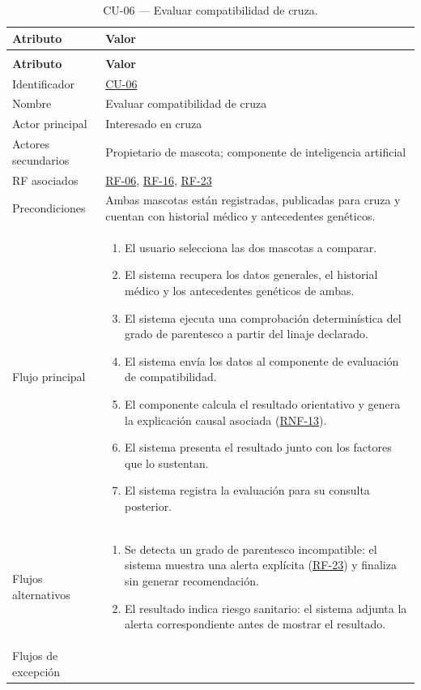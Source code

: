 \documentclass[journal,onecolumn]{IEEEtran}
\makeatletter
\newenvironment{atributos}[2]{%
	\small
	\begin{longtable}{@{}>{\raggedright\arraybackslash}p{4.2cm} >{\raggedright\arraybackslash}p{11.2cm}@{}}
		\caption{#2}\label{tab:#1}\\
		\toprule
		\textbf{Atributo} & \textbf{Valor} \\
		\midrule
		\endfirsthead
		\multicolumn{2}{@{}l}{\small\itshape (continuación)}\\
		\toprule
		\textbf{Atributo} & \textbf{Valor} \\
		\midrule
		\endhead
		\bottomrule
		\endlastfoot
	}{%
	\end{longtable}
	\normalsize
}
\makeatother
\begin{document}
	\begin{atributos}{CU-06}{CU-06 --- Evaluar compatibilidad de cruza.}
		Identificador & \hyperref[tab:CU-06]{CU-06} \\
		Nombre & Evaluar compatibilidad de cruza \\
		Actor principal & Interesado en cruza \\
		Actores secundarios & Propietario de mascota; componente de inteligencia artificial \\
		RF asociados & \hyperref[tab:RF-06]{RF-06}, \hyperref[tab:RF-16]{RF-16}, \hyperref[tab:RF-23]{RF-23} \\
		Precondiciones & Ambas mascotas están registradas, publicadas para cruza y cuentan con historial médico y antecedentes genéticos. \\
		Flujo principal &
		\begin{enumerate}[leftmargin=*, nosep]
			\item El usuario selecciona las dos mascotas a comparar.
			\item El sistema recupera los datos generales, el historial médico y los antecedentes genéticos de ambas.
			\item El sistema ejecuta una comprobación determinística del grado de parentesco a partir del linaje declarado.
			\item El sistema envía los datos al componente de evaluación de compatibilidad.
			\item El componente calcula el resultado orientativo y genera la explicación causal asociada (\hyperref[tab:RNF-13]{RNF-13}).
			\item El sistema presenta el resultado junto con los factores que lo sustentan.
			\item El sistema registra la evaluación para su consulta posterior.
		\end{enumerate} \\
		Flujos alternativos &
		\begin{enumerate}[leftmargin=*, nosep]
			\item[3.1] Se detecta un grado de parentesco incompatible: el sistema muestra una alerta explícita (\hyperref[tab:RF-23]{RF-23}) y finaliza sin generar recomendación.
			\item[6.1] El resultado indica riesgo sanitario: el sistema adjunta la alerta correspondiente antes de mostrar el resultado.
		\end{enumerate} \\
		Flujos de excepción &
		\begin{enumerate}[leftmargin=*, nosep]

\end{enumerate}
\end{atributos}
\end{document}
